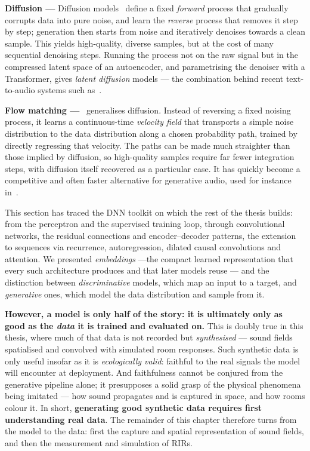 \textbf{Diffusion ---} Diffusion models~\citep{ho2020denoising} define a
fixed \emph{forward} process that gradually corrupts data into pure noise,
and learn the \emph{reverse} process that removes it step by step;
generation then starts from noise and iteratively denoises towards a clean
sample. This yields high-quality, diverse samples, but at the cost of many
sequential denoising steps. Running the process not on the raw signal but
in the compressed latent space of an autoencoder, and parametrising the
denoiser with a Transformer, gives \emph{latent diffusion} models --- the
combination behind recent text-to-audio systems such as~\citep{evans2025stable,nistal2024improving}.

\textbf{Flow matching ---}~\citep{lipman2022flow}
generalises diffusion. Instead of reversing a fixed noising process, it
learns a continuous-time \emph{velocity field} that transports a simple
noise distribution to the data distribution along a chosen probability
path, trained by directly regressing that velocity. The paths can be made
much straighter than those implied by diffusion, so high-quality samples
require far fewer integration steps, with diffusion itself recovered as a
particular case. It has quickly become a competitive and often faster
alternative for generative audio, used for instance in~\citep{mehta2024matcha}.


This section has traced the \acrshort{DNN} toolkit on which the rest of the
thesis builds: from the perceptron and the supervised training loop,
through convolutional networks, the residual
connections and encoder--decoder patterns, the extension to sequences via recurrence, autoregression,
dilated causal convolutions and attention. We presented \emph{embeddings} ---the compact learned representation that every such
architecture produces and that later models reuse --- and the
distinction between \emph{discriminative} models, which map an
input to a target, and \emph{generative} ones, which model the data
distribution and sample from it.

\textbf{However, a model is only half of the story: it is ultimately only as
good as the \emph{data} it is trained and evaluated on.} This is doubly true
in this thesis, where much of that data is not recorded but
\emph{synthesised} --- sound fields spatialised and convolved with simulated
room responses. Such synthetic data is only useful insofar as it is
\emph{ecologically valid}: faithful to the real signals the model will
encounter at deployment. And faithfulness cannot be conjured from the
generative pipeline alone; it presupposes a solid grasp of the physical
phenomena being imitated --- how sound propagates and is captured in space,
and how rooms colour it. In short, \textbf{generating good synthetic data
requires first understanding real data}. The remainder of this chapter
therefore turns from the model to the data: first the capture and spatial
representation of sound fields, and then the measurement and simulation of
\acrshort{RIR}s.

